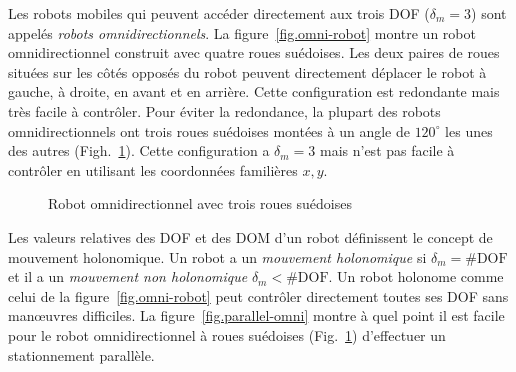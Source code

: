 {Les robots mobiles qui peuvent accéder directement aux trois DOF ($\delta_m=3$) sont appelés \emph{robots omnidirectionnels}\label{robot omnidirectionnel}. La figure~\ref{fig.omni-robot} montre un robot omnidirectionnel construit avec quatre roues suédoises. Les deux paires de roues situées sur les côtés opposés du robot peuvent directement déplacer le robot à gauche, à droite, en avant et en arrière. Cette configuration est redondante mais très facile à contrôler. Pour éviter la redondance, la plupart des robots omnidirectionnels ont trois roues suédoises montées à un angle de $120^\circ$ les unes des autres (Figh.~\ref{fig.omni3}). Cette configuration a $\delta_m=3$ mais n'est pas facile à contrôler en utilisant les coordonnées familières $x,y$.

\begin{figure}
\begin{center}
\end{center}
\caption{Robot omnidirectionnel avec trois roues suédoises}\label{fig.omni3}
\end{figure}

Les valeurs relatives des DOF et des DOM d'un robot définissent le concept de mouvement holonomique. Un robot a un \emph{mouvement holonomique} si $\delta_m = \#\textrm{DOF}$ et il a un \emph{mouvement non holonomique} $\delta_m < \#\textrm{DOF}$. Un robot holonome comme celui de la figure~\ref{fig.omni-robot} peut contrôler directement toutes ses DOF sans manœuvres difficiles. La figure~\ref{fig.parallel-omni} montre à quel point il est facile pour le robot omnidirectionnel à roues suédoises (Fig.~\ref{fig.omni3}) d'effectuer un stationnement parallèle.

}
